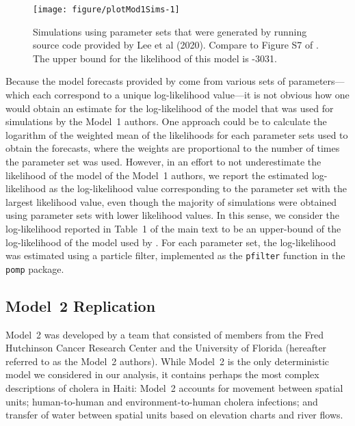 \begin{knitrout}
\color{fgcolor}\begin{figure}

{\centering \texttt{[image: figure/plotMod1Sims-1]} 

}

\caption[Simulations using parameter sets that were generated by running source code provided by Lee et al (2020)]{Simulations using parameter sets that were generated by running source code provided by Lee et al (2020). Compare to Figure S7 of \cite{lee20sup}. The upper bound for the likelihood of this model is -3031.}\label{fig:plotMod1Sims}
\end{figure}

\end{knitrout}

Because the model forecasts provided by \cite{lee20} come from various sets of parameters---which each correspond to a unique log-likelihood value---it is not obvious how one would obtain an estimate for the log-likelihood of the model that was used for simulations by the Model~1 authors.
One approach could be to calculate the logarithm of the weighted mean of the likelihoods for each parameter sets used to obtain the forecasts, where the weights are proportional to the number of times the parameter set was used.
However, in an effort to not underestimate the likelihood of the model of the Model~1 authors, we report the estimated log-likelihood as the log-likelihood value corresponding to the parameter set with the largest likelihood value, even though the majority of simulations were obtained using parameter sets with lower likelihood values.
In this sense, we consider the log-likelihood reported in Table~1 of the main text to be an upper-bound of the log-likelihood of the model used by \cite{lee20}.
For each parameter set, the log-likelihood was estimated using a particle filter, implemented as the \texttt{pfilter} function in the \texttt{pomp} package.

\subsection{Model~2 Replication}\label{sec:mod2rep}

Model~2 was developed by a team that consisted of members from the Fred Hutchinson Cancer Research Center and the University of Florida (hereafter referred to as the Model~2 authors).
While Model~2 is the only deterministic model we considered in our analysis, it contains perhaps the most complex descriptions of cholera in Haiti: Model~2 accounts for movement between spatial units; human-to-human and environment-to-human cholera infections; and transfer of water between spatial units based on elevation charts and river flows.

